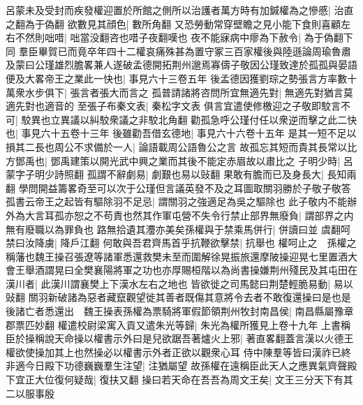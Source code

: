 呂蒙未及受封而疾發權迎置於所館之側所以治護者萬方時有加鍼權為之慘慼|{
	治直之翻為于偽翻}
欲數見其顔色|{
	數所角翻}
又恐勞動常穿壁瞻之見小能下食則喜顧左右不然則咄唶|{
	咄當没翻咨也唶子夜翻嘆也}
夜不能寐病中瘳為下赦令|{
	為于偽翻下同}
羣臣畢賀已而竟卒年四十二權哀痛殊甚為置守冢三百家權後與陸遜論周瑜魯肅及蒙曰公瑾雄烈膽畧兼人遂破孟德開拓荆州邈焉寡儔子敬因公瑾致達於孤孤與晏語便及大畧帝王之業此一快也|{
	事見六十三卷五年}
後孟德因獲劉琮之勢張言方率數十萬衆水步俱下|{
	張言者張大而言之}
孤普請諸將咨問所宜無適先對|{
	無適先對猶言莫適先對也適音的}
至張子布秦文表|{
	秦松字文表}
俱言宜遣使修檄迎之子敬即駮言不可|{
	駮異也立異議以糾駮衆議之非駮北角翻}
勸孤急呼公瑾付任以衆逆而擊之此二快也|{
	事見六十五卷十三年}
後雖勸吾借玄德地|{
	事見六十六卷十五年}
是其一短不足以損其二長也周公不求備於一人|{
	論語載周公語魯公之言}
故孤忘其短而貴其長常以比方鄧禹也|{
	鄧禹建策以開光武中興之業而其後不能定赤眉故以肅比之}
子明少時|{
	呂蒙字子明少詩照翻}
孤謂不辭劇易|{
	劇艱也易以䜴翻}
果敢有膽而已及身長大|{
	長知兩翻}
學問開益籌畧奇至可以次于公瑾但言議英發不及之耳圖取關羽勝於子敬子敬答孤書云帝王之起皆有驅除羽不足忌|{
	謂關羽之強適足為吳之驅除也}
此子敬内不能辦外為大言耳孤亦恕之不苟責也然其作軍屯營不失令行禁止部界無廢負|{
	謂部界之内無有廢職以為罪負也}
路無拾遺其灋亦美矣孫權與于禁乘馬併行|{
	併讀曰並}
虞翻呵禁曰汝降虜|{
	降戶江翻}
何敢與吾君齊馬首乎抗鞭欲擊禁|{
	抗舉也}
權呵止之　孫權之稱藩也魏王操召張遼等諸軍悉還救樊未至而圍解徐晃振旅還摩陂操迎晃七里置酒大會王舉酒謂晃曰全樊襄陽將軍之功也亦厚賜桓階以為尚書操嫌荆州殘民及其屯田在漢川者|{
	此漢川謂襄樊上下漢水左右之地也}
皆欲徙之司馬懿曰荆楚輕脆易動|{
	易以䜴翻}
關羽新破諸為惡者藏竄觀望徙其善者既傷其意將令去者不敢復還操曰是也是後諸亡者悉還出　魏王操表孫權為票騎將軍假節領荆州牧封南昌侯|{
	南昌縣屬豫章郡票匹妙翻}
權遣校尉梁寓入貢又遣朱光等歸|{
	朱光為權所獲見上卷十九年}
上書稱臣於操稱說天命操以權書示外曰是兒欲踞吾著爐火上邪|{
	著直畧翻蓋言漢以火德王權欲使操加其上也然操必以權書示外者正欲以觀衆心耳}
侍中陳羣等皆曰漢祚已終非適今日殿下功德巍巍羣生注望|{
	注猶屬望}
故孫權在遠稱臣此天人之應異氣齊聲殿下宜正大位復何疑哉|{
	復扶又翻}
操曰若天命在吾吾為周文王矣|{
	文王三分天下有其二以服事殷}



